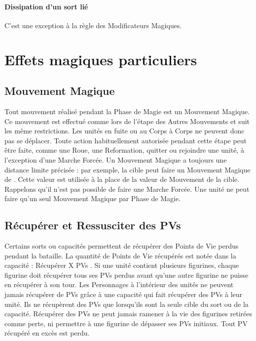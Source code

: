 \paragraph{Dissipation d'un sort lié}

 C'est une exception à la règle des Modificateurs Magiques.

\newpage
\section{Effets magiques particuliers}

\hypertarget{magicalmove}{\subsection{Mouvement Magique}}
\label{magicalmove}

Tout mouvement réalisé pendant la Phase de Magie est un Mouvement Magique. Ce mouvement est effectué comme lors de l'étape des Autres Mouvements et suit les même restrictions. Les unités en fuite ou au Corps à Corps ne peuvent donc pas se déplacer. Toute action habituellement autorisée pendant cette étape peut être faite, comme une Roue, une Reformation, quitter ou rejoindre une unité, à l'exception d'une Marche Forcée. Un Mouvement Magique a toujours une distance limite précisée : par exemple, \og la cible peut faire un Mouvement Magique de  \fg{}. Cette valeur est utilisée à la place de la valeur de Mouvement de la cible. Rappelons qu'il n'est pas possible de faire une Marche Forcée. Une unité ne peut faire qu'un seul Mouvement Magique par Phase de Magie.

\hypertarget{recoverandraisewounds}{\subsection{Récupérer et Ressusciter des PVs}}
\label{recoverandraisewounds}

Certains sorts ou capacités permettent de récupérer des Points de Vie perdus pendant la bataille. La quantité de Points de Vie récupérés est notée dans la capacité  : \og Récupérer X PVs \fg{}. Si une unité contient plusieurs figurines, chaque figurine doit récupérer tous ses PVs perdus avant qu'une autre figurine ne puisse en récupérer à son tour. Les Personnages à l'intérieur des unités ne peuvent jamais récupérer de PVs grâce à une capacité qui fait récupérer des PVs à leur unité. Ils ne récupèrent des PVs que lorsqu'ils sont la seule cible du sort ou de la capacité. Récupérer des PVs ne peut jamais ramener à la vie des figurines retirées comme perte, ni permettre à une figurine de dépasser ses PVs initiaux. Tout PV récupéré en excès est perdu.

